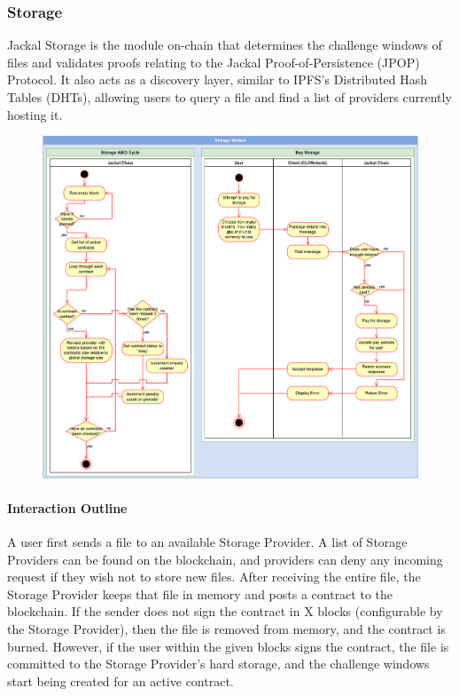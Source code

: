 \documentclass[a4paper]{article}
\begin{document}
\subsubsection{Storage}
Jackal Storage is the module on-chain that determines the challenge windows of files and validates proofs relating to the Jackal Proof-of-Persistence (JPOP) Protocol. It also acts as a discovery layer, similar to IPFS's Distributed Hash Tables (DHTs), allowing users to query a file and find a list of providers currently hosting it. \cite{dht}
\begin{figure}[!htbp]
\centering
\includegraphics[width=1\textwidth]{assets/storage1.png}
\caption{}
\end{figure}

\paragraph{Interaction Outline}
A user first sends a file to an available Storage Provider. A list of Storage Providers can be found on the blockchain, and providers can deny any incoming request if they wish not to store new files. After receiving the entire file, the Storage Provider keeps that file in memory and posts a contract to the blockchain. If the sender does not sign the contract in X blocks (configurable by the Storage Provider), then the file is removed from memory, and the contract is burned. However, if the user within the given blocks signs the contract, the file is committed to the Storage Provider's hard storage, and the challenge windows start being created for an active contract.
\end{document}
